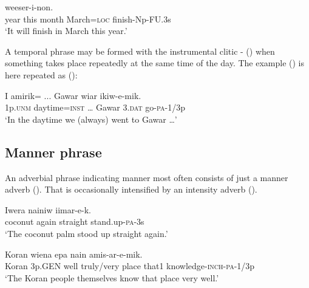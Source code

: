 \ea%
\label{ex:x878}
\gll {}     weeser-i-non. \\
   year  this  month  March=\textsc{loc}  finish-Np-FU.3s   \\
\glt`It will finish in March this year.' 
\z





A temporal phrase may be formed with the instrumental clitic - () when something takes place repeatedly at the same time of the day. The example () is here repeated as ():

\ea%
\label{ex:x1907}
\gll I  amirik=  ...  Gawar  wiar  ikiw-e-mik. \\
  1p.\textsc{unm}  daytime=\textsc{inst}  {\dots}  Gawar  3.\textsc{dat}  go-\textsc{pa}-1/3p    \\
\glt`In the daytime we (always) went to Gawar {\dots}'
\z





\subsection{Manner phrase}
{}
An adverbial phrase indicating manner most often consists of just a manner adverb ().  That is occasionally intensified by an intensity adverb (). 

\ea%
\label{ex:x880}
\gll Iwera  nainiw    iimar-e-k. \\
  coconut  again  straight  stand.up-\textsc{pa}-3s    \\
\glt`The coconut palm stood up straight again.'
\z





\ea%
\label{ex:x879}
\gll Koran  wiena     epa  nain amis-ar-e-mik.\\
  Koran  3p.GEN  well  truly/very  place  that1   knowledge-\textsc{inch}-\textsc{pa}-1/3p\\
\glt`The Koran people themselves know that place very well.'
\z









